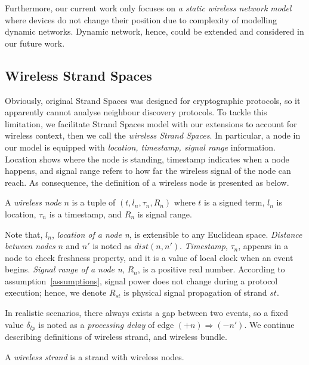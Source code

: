 Furthermore, our current work only focuses on \textit{a static wireless network model} where devices do not change their position due to complexity of modelling dynamic networks. Dynamic network, hence, could be extended and considered in our future work. 

\subsection{Wireless Strand Spaces}

Obviously, original Strand Spaces was designed for cryptographic protocols, so it apparently cannot analyse neighbour discovery protocols. To tackle this limitation, we facilitate Strand Spaces model with our extensions to account for wireless context, then we call the \textit{wireless Strand Spaces}. In particular, a node in our model is equipped with \textit{location, timestamp, signal range} information. Location shows where the node is standing, timestamp indicates when a node happens, and signal range refers to how far the wireless signal of the node can reach. As consequence, the definition of a wireless node is presented as below.

\begin{Definition} A \emph{wireless node} $n$ is a tuple of $(t, l_n, \tau_{n}, R_n)$ where $t$ is a signed term, $l_n$ is location, $\tau_{n}$ is a timestamp, and $R_n$ is signal range.\end{Definition}

Note that, $l_n$, \textit{location of a node n}, is extensible to any Euclidean space. \textit{Distance between nodes} $n$ and $n'$ is noted as $dist(n,n')$. \textit{Timestamp}, $\tau_{n}$, appears in a node to check freshness property, and it is a value of local clock when an event begins. \textit{Signal range of a node n}, $R_n$, is a positive real number. According to assumption~\ref{assumptions}, signal power does not change during a protocol execution; hence, we denote $R_{st}$ is physical signal  propagation of strand $st$. 

In realistic scenarios, there always exists a gap between two events, so a fixed value $\delta_{tp}$ is noted as a \textit{processing delay} of edge $ (+n) \Rightarrow (-n')$. We continue describing definitions of wireless strand, and wireless bundle. 

\begin{Definition} A \emph{wireless strand} is a strand with wireless nodes.
\end{Definition}

